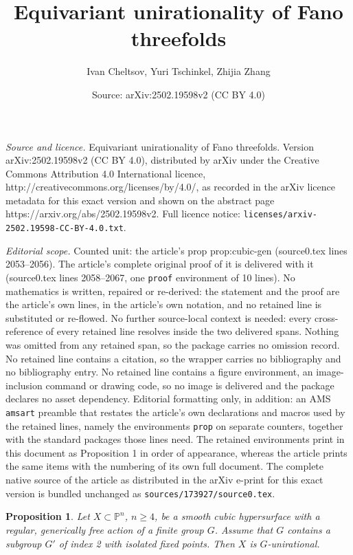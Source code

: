 \documentclass[10pt,a4paper]{amsart}
\title{Equivariant unirationality of Fano threefolds}
\author{Ivan Cheltsov, Yuri Tschinkel, Zhijia Zhang}
\date{Source: arXiv:2502.19598v2 (CC BY 4.0)}
\newtheorem{prop}{Proposition}
\def\bP{{\mathbb P}}
\begin{document}
\maketitle

\noindent\emph{Source and licence.} Equivariant unirationality of Fano threefolds. Version arXiv:2502.19598v2 (CC BY 4.0), distributed by arXiv under the Creative Commons Attribution 4.0 International licence, http://creativecommons.org/licenses/by/4.0/, as recorded in the arXiv licence metadata for this exact version and shown on the abstract page https://arxiv.org/abs/2502.19598v2. Full licence notice: \texttt{licenses/arxiv-2502.19598-CC-BY-4.0.txt}.\par\smallskip

\noindent\textit{Editorial scope.} Counted unit: the article's prop prop:cubic-gen (source0.tex lines 2053--2056). The article's complete original proof of it is delivered with it (source0.tex lines 2058--2067, one \texttt{proof} environment of 10 lines). No mathematics is written, repaired or re-derived: the statement and the proof are the article's own lines, in the article's own notation, and no retained line is substituted or re-flowed.  No further source-local context is needed: every cross-reference of every retained line resolves inside the two delivered spans.  Nothing was omitted from any retained span, so the package carries no omission record.  No retained line contains a citation, so the wrapper carries no bibliography and no bibliography entry.  No retained line contains a figure environment, an image-inclusion command or drawing code, so no image is delivered and the package declares no asset dependency.  Editorial formatting only, in addition: an AMS \texttt{amsart} preamble that restates the article's own declarations and macros used by the retained lines, namely the environments \texttt{prop} on separate counters, together with the standard packages those lines need.  The retained environments print in this document as Proposition 1 in order of appearance, whereas the article prints the same items with the numbering of its own full document.  The complete native source of the article as distributed in the arXiv e-print for this exact version is bundled unchanged as \texttt{sources/173927/source0.tex}.
\begin{prop}
\label{prop:cubic-gen}
Let $X\subset \bP^n$, $n\ge 4$, be a smooth cubic hypersurface with a regular, generically free action of a finite group $G$. Assume that $G$ contains a subgroup $G'$ of index 2 with isolated fixed points. Then $X$ is $G$-unirational. 
\end{prop}
\end{document}
